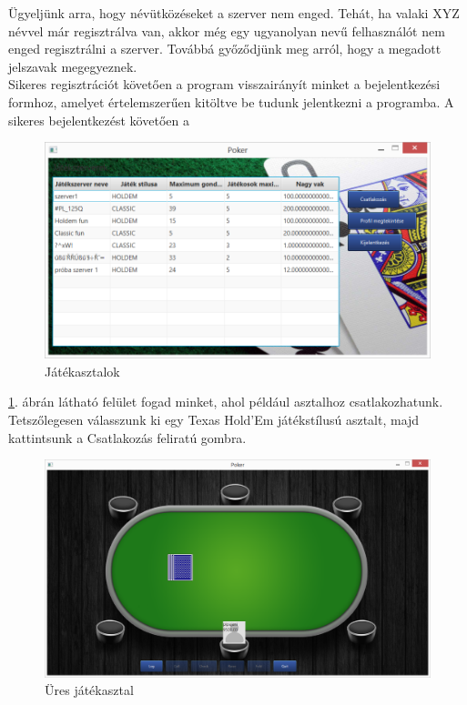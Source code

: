 Ügyeljünk arra, hogy névütközéseket a szerver nem enged. Tehát, ha valaki XYZ névvel már regisztrálva van, akkor még egy ugyanolyan nevű felhasználót nem enged regisztrálni a szerver. Továbbá győződjünk meg arról, hogy a megadott jelszavak megegyeznek.  \\
Sikeres regisztrációt követően a program visszairányít minket a bejelentkezési formhoz, amelyet értelemszerűen kitöltve be tudunk jelentkezni a programba.
A sikeres bejelentkezést követően a
\begin{figure}[h!]
  \caption{Játékasztalok}
  \label{fig:poker_tables}
  \centering
    \includegraphics[width=\textwidth]{user-documentation/images/tables.jpg}
\end{figure}
\ref{fig:poker_tables}. ábrán látható felület fogad minket, ahol például asztalhoz csatlakozhatunk. Tetszőlegesen válasszunk ki egy Texas Hold'Em játékstílusú asztalt, majd kattintsunk a Csatlakozás feliratú gombra.
\begin{figure}[h!]
  \caption{Üres játékasztal}
  \label{fig:parti_1}
  \centering
    \includegraphics[width=\textwidth]{user-documentation/images/parti/parti_1.jpg}
\end{figure}

